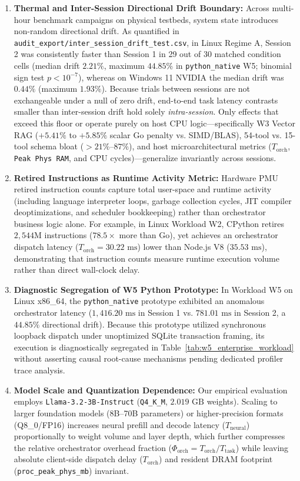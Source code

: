 \documentclass[11pt,a4paper]{article}
\begin{document}
\begin{enumerate}
    \item \textbf{Thermal and Inter-Session Directional Drift Boundary:} Across multi-hour benchmark campaigns on physical testbeds, system state introduces non-random directional drift. As quantified in \texttt{audit\_export/inter\_session\_drift\_test.csv}, in Linux Regime A, Session 2 was consistently faster than Session 1 in 29 out of 30 matched condition cells (median drift $2.21\%$, maximum $44.85\%$ in \texttt{python\_native} W5; binomial sign test $p < 10^{-7}$), whereas on Windows 11 NVIDIA the median drift was $0.44\%$ (maximum $1.93\%$). Because trials between sessions are not exchangeable under a null of zero drift, end-to-end task latency contrasts smaller than inter-session drift hold solely \textit{intra-session}. Only effects that exceed this floor or operate purely on host CPU logic---specifically W3 Vector RAG ($+5.41\%$ to $+5.85\%$ scalar Go penalty vs. SIMD/BLAS), 54-tool vs. 15-tool schema bloat ($>21\%\text{--}87\%$), and host microarchitectural metrics ($T_{\text{orch}}$, \texttt{Peak Phys RAM}, and CPU cycles)---generalize invariantly across sessions.
    \item \textbf{Retired Instructions as Runtime Activity Metric:} Hardware PMU retired instruction counts capture total user-space and runtime activity (including language interpreter loops, garbage collection cycles, JIT compiler deoptimizations, and scheduler bookkeeping) rather than orchestrator business logic alone. For example, in Linux Workload W2, CPython retires $2{,}544\text{M}$ instructions ($78.5\times$ more than Go), yet achieves an orchestrator dispatch latency ($T_{\text{orch}} = 30.22\text{ ms}$) lower than Node.js V8 ($35.53\text{ ms}$), demonstrating that instruction counts measure runtime execution volume rather than direct wall-clock delay.
    \item \textbf{Diagnostic Segregation of W5 Python Prototype:} In Workload W5 on Linux x86\_64, the \texttt{python\_native} prototype exhibited an anomalous orchestrator latency ($1{,}416.20\text{ ms}$ in Session 1 vs. $781.01\text{ ms}$ in Session 2, a $44.85\%$ directional drift). Because this prototype utilized synchronous loopback dispatch under unoptimized SQLite transaction framing, its execution is diagnostically segregated in Table~\ref{tab:w5_enterprise_workload} without asserting causal root-cause mechanisms pending dedicated profiler trace analysis.
    \item \textbf{Model Scale and Quantization Dependence:} Our empirical evaluation employs \texttt{Llama-3.2-3B-Instruct} (\texttt{Q4\_K\_M}, $2.019\text{ GB}$ weights). Scaling to larger foundation models (8B--70B parameters) or higher-precision formats (Q8\_0/FP16) increases neural prefill and decode latency ($T_{\text{neural}}$) proportionally to weight volume and layer depth, which further compresses the relative orchestrator overhead fraction ($\Phi_{\text{orch}} = T_{\text{orch}} / T_{\text{task}}$) while leaving absolute client-side dispatch delay ($T_{\text{orch}}$) and resident DRAM footprint (\texttt{proc\_peak\_phys\_mb}) invariant.

\end{enumerate}
\end{document}

